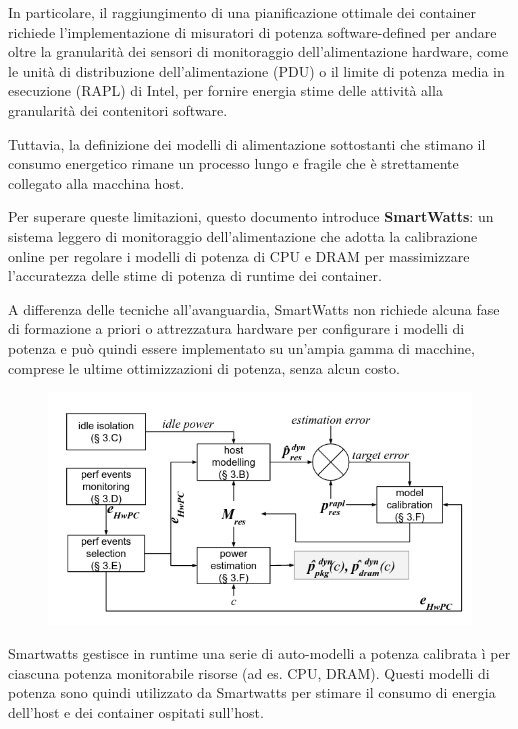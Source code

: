 \documentclass[a4paper, 11pt]{article}
\begin{document}
In particolare, il raggiungimento di una pianificazione ottimale dei container richiede l'implementazione di misuratori di potenza software-defined per andare oltre la granularità dei sensori di monitoraggio dell'alimentazione hardware, come le unità di distribuzione dell'alimentazione (PDU) o il limite di potenza media in esecuzione (RAPL) di Intel, per fornire energia stime delle attività alla granularità dei contenitori software. 

Tuttavia, la definizione dei modelli di alimentazione sottostanti che stimano il consumo energetico rimane un processo lungo e fragile che è strettamente collegato alla macchina host.
 
Per superare queste limitazioni, questo documento introduce \textbf{SmartWatts}: un sistema leggero di monitoraggio dell'alimentazione che adotta la calibrazione online per regolare i modelli di potenza di CPU e DRAM per massimizzare l'accuratezza delle stime di potenza di runtime dei container.
 
A differenza delle tecniche all'avanguardia, SmartWatts non richiede alcuna fase di formazione a priori o attrezzatura hardware per configurare i modelli di potenza e può quindi essere implementato su un'ampia gamma di macchine, comprese le ultime ottimizzazioni di potenza, senza alcun costo.

\begin{figure}[h]
\centering
\includegraphics[scale=0.65]{smartwatts}
\centering
\end{figure}


Smartwatts gestisce in runtime una serie di auto-modelli a potenza calibrata ì per ciascuna potenza monitorabile
risorse (ad es. CPU, DRAM). Questi modelli di potenza sono
quindi utilizzato da Smartwatts per stimare il consumo di energia dell'host e dei container ospitati sull'host. 
\end{document}
